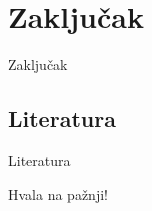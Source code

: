 \documentclass[xcolor={dvipsnames}, 11pt]{beamer}
\begin{document}
\section{Zaključak}
\begin{frame}{Zaključak}
	
\end{frame}


\subsection{Literatura}
\begin{frame}{Literatura}
	
\end{frame}

\begin{frame}
	Hvala na pažnji!
\end{frame}
	
	
\end{document}
